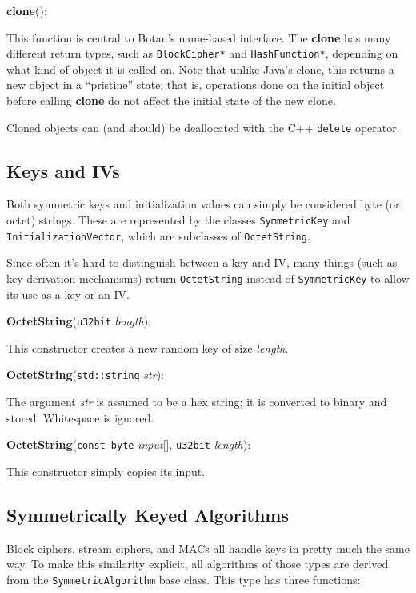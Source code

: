 \documentclass{article}
\newcommand{\function}[1]{\textbf{#1}}
\newcommand{\type}[1]{\texttt{#1}}
\renewcommand{\arg}[1]{\textsl{#1}}
\begin{document}
\noindent
\function{clone}():

This function is central to Botan's name-based interface. The \function{clone}
has many different return types, such as \type{BlockCipher*} and
\type{HashFunction*}, depending on what kind of object it is called on. Note
that unlike Java's clone, this returns a new object in a ``pristine'' state;
that is, operations done on the initial object before calling \function{clone}
do not affect the initial state of the new clone.

Cloned objects can (and should) be deallocated with the C++ \texttt{delete}
operator.

\subsection{Keys and IVs}

Both symmetric keys and initialization values can simply be considered byte (or
octet) strings. These are represented by the classes \type{SymmetricKey} and
\type{InitializationVector}, which are subclasses of \type{OctetString}.

Since often it's hard to distinguish between a key and IV, many things (such as
key derivation mechanisms) return \type{OctetString} instead of
\type{SymmetricKey} to allow its use as a key or an IV.

\noindent
\function{OctetString}(\type{u32bit} \arg{length}):

This constructor creates a new random key of size \arg{length}.

\noindent
\function{OctetString}(\type{std::string} \arg{str}):

The argument \arg{str} is assumed to be a hex string; it is converted to binary
and stored. Whitespace is ignored.

\noindent
\function{OctetString}(\type{const byte} \arg{input}[], \type{u32bit}
\arg{length}):

This constructor simply copies its input.

\subsection{Symmetrically Keyed Algorithms}

Block ciphers, stream ciphers, and MACs all handle keys in pretty much the same
way. To make this similarity explicit, all algorithms of those types are
derived from the \type{SymmetricAlgorithm} base class. This type has three
functions:
\end{document}

